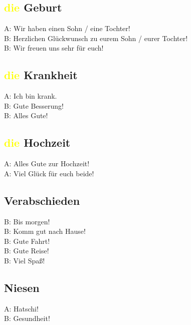 \subsection{\textcolor{yellow}{die} Geburt}
A: Wir haben einen Sohn / eine Tochter! \\
B: Herzlichen Glückwunsch zu eurem Sohn / eurer Tochter! \\
B: Wir freuen uns sehr für euch! \\

\subsection{\textcolor{yellow}{die} Krankheit}
\noindent
A: Ich bin krank. \\
B: Gute Besserung! \\
B: Alles Gute!  \\

\subsection{\textcolor{yellow}{die} Hochzeit}
A: Alles Gute zur Hochzeit! \\
A: Viel Glück für euch beide!  \\

\subsection{Verabschieden}
B: Bis morgen!  \\
B: Komm gut nach Hause! \\
B: Gute Fahrt! \\
B: Gute Reise! \\
B: Viel Spaß!  \\

\subsection{Niesen}
A: Hatschi! \\
B: Gesundheit! \\

